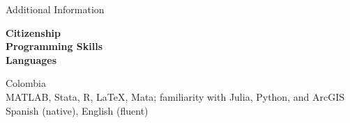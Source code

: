 \documentclass{resume} %
\begin{document}
	\pagebreak
	\begin{rSection}{Additional Information}
		\begin{minipage}[t]{0.25\textwidth}
			\textbf{Citizenship}\\

			\textbf{Programming Skills}\\

			\textbf{Languages}
		\end{minipage}
		\begin{minipage}[t]{0.75\textwidth}
				Colombia\\

				MATLAB, Stata, R, \LaTeX, Mata; familiarity with Julia, Python, and ArcGIS\\

				Spanish (native), English (fluent)
		\end{minipage}
	\end{rSection}
\end{document}
